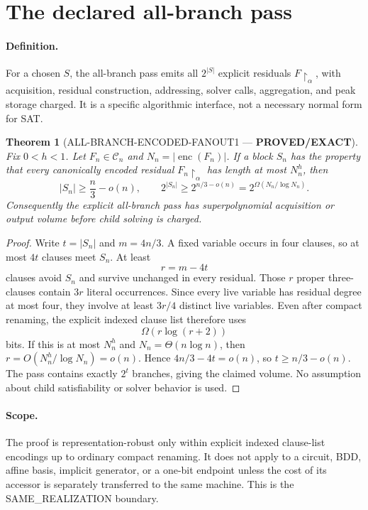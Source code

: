 \documentclass[11pt]{article}
\newcommand{\EXACT}{\textbf{PROVED/EXACT}}
\newtheorem{theorem}{Theorem}
\begin{document}
\section{The declared all-branch pass}

\paragraph{Definition.}
For a chosen $S$, the all-branch pass emits all $2^{|S|}$ explicit residuals
$F\!\upharpoonright_\alpha$, with acquisition, residual construction,
addressing, solver calls, aggregation, and peak storage charged.  It is a
specific algorithmic interface, not a necessary normal form for SAT.

\begin{theorem}[ALL-BRANCH-ENCODED-FANOUT1 --- \EXACT]
Fix $0<h<1$.  Let $F_n\in\mathcal C_n$ and $N_n=|\operatorname{enc}(F_n)|$.
If a block $S_n$ has the property that every canonically encoded residual
$F_n\!\upharpoonright_\alpha$ has length at most $N_n^h$, then
\[
 |S_n|\ge \frac n3-o(n),\qquad
 2^{|S_n|}\ge 2^{n/3-o(n)}=2^{\Omega(N_n/\log N_n)}.
\]
Consequently the explicit all-branch pass has superpolynomial acquisition or
output volume before child solving is charged.
\end{theorem}

\begin{proof}
Write $t=|S_n|$ and $m=4n/3$.  A fixed variable occurs in four clauses, so at
most $4t$ clauses meet $S_n$.  At least
\[
 r=m-4t
\]
clauses avoid $S_n$ and survive unchanged in every residual.  Those $r$
proper three-clauses contain $3r$ literal occurrences.  Since every live
variable has residual degree at most four, they involve at least $3r/4$
distinct live variables.  Even after compact renaming, the explicit indexed
clause list therefore uses
\[
 \Omega\!\left(r\log(r+2)\right)
\]
bits.  If this is at most $N_n^h$ and $N_n=\Theta(n\log n)$, then
$r=O(N_n^h/\log N_n)=o(n)$.  Hence
$4n/3-4t=o(n)$, so $t\ge n/3-o(n)$.  The pass contains exactly $2^t$
branches, giving the claimed volume.  No assumption about child
satisfiability or solver behavior is used.
\end{proof}

\paragraph{Scope.}
The proof is representation-robust only within explicit indexed clause-list
encodings up to ordinary compact renaming.  It does not apply to a circuit,
BDD, affine basis, implicit generator, or a one-bit endpoint unless the cost
of its accessor is separately transferred to the same machine.  This is the
SAME\_REALIZATION boundary.
\end{document}
